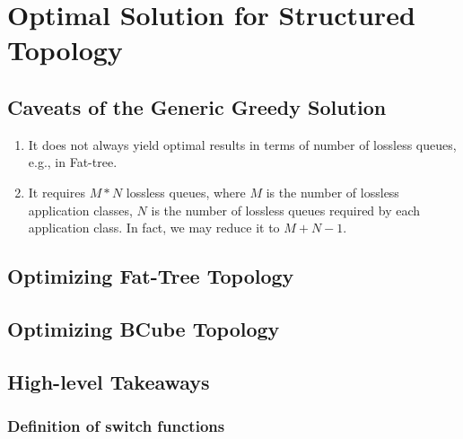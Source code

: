 \section{Optimal Solution for Structured Topology}\label{sec:specific}

\subsection{Caveats of the Generic Greedy Solution}

\begin{enumerate}
	\item It does not always yield optimal results in terms of number of lossless queues, e.g., in Fat-tree.
	
	\item It requires $M*N$ lossless queues, where $M$ is the number of lossless application classes, 
	$N$ is the number of lossless queues required by each application class. In fact, we may reduce it to $M+N-1$.
 
\end{enumerate}

\subsection{Optimizing Fat-Tree Topology}

\subsection{Optimizing BCube Topology}

\subsection{High-level Takeaways}


\subsubsection{Definition of switch functions}
 
